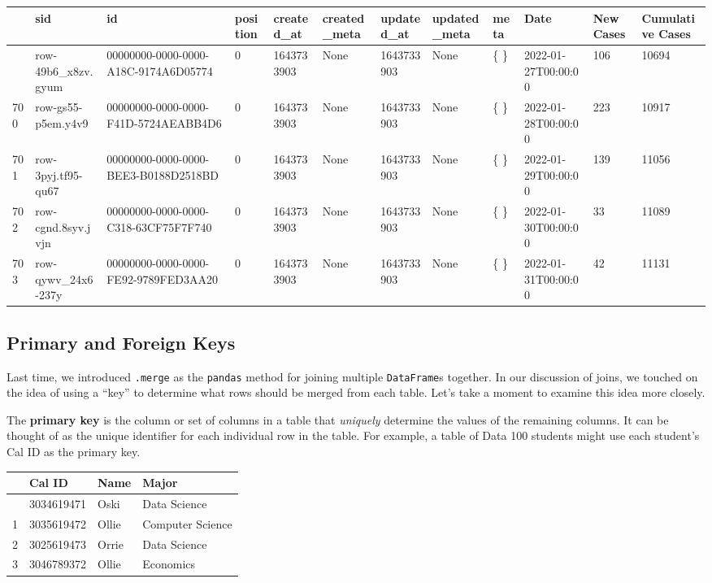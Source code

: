 \documentclass[
  letterpaper,
  DIV=11,
  numbers=noendperiod]{scrreprt}
\begin{document}
\begin{longtable}[]{@{}llllllllllll@{}}
\toprule\noalign{}
& sid & id & position & created\_at & created\_meta & updated\_at &
updated\_meta & meta & Date & New Cases & Cumulative Cases \\
\midrule\noalign{}
\endhead
\bottomrule\noalign{}
\endlastfoot
699 & row-49b6\_x8zv.gyum & 00000000-0000-0000-A18C-9174A6D05774 & 0 &
1643733903 & None & 1643733903 & None & \{ \} & 2022-01-27T00:00:00 &
106 & 10694 \\
700 & row-gs55-p5em.y4v9 & 00000000-0000-0000-F41D-5724AEABB4D6 & 0 &
1643733903 & None & 1643733903 & None & \{ \} & 2022-01-28T00:00:00 &
223 & 10917 \\
701 & row-3pyj.tf95-qu67 & 00000000-0000-0000-BEE3-B0188D2518BD & 0 &
1643733903 & None & 1643733903 & None & \{ \} & 2022-01-29T00:00:00 &
139 & 11056 \\
702 & row-cgnd.8syv.jvjn & 00000000-0000-0000-C318-63CF75F7F740 & 0 &
1643733903 & None & 1643733903 & None & \{ \} & 2022-01-30T00:00:00 & 33
& 11089 \\
703 & row-qywv\_24x6-237y & 00000000-0000-0000-FE92-9789FED3AA20 & 0 &
1643733903 & None & 1643733903 & None & \{ \} & 2022-01-31T00:00:00 & 42
& 11131 \\
\end{longtable}

\subsection{Primary and Foreign Keys}\label{primary-and-foreign-keys}

Last time, we introduced \texttt{.merge} as the \texttt{pandas} method
for joining multiple \texttt{DataFrame}s together. In our discussion of
joins, we touched on the idea of using a ``key'' to determine what rows
should be merged from each table. Let's take a moment to examine this
idea more closely.

The \textbf{primary key} is the column or set of columns in a table that
\emph{uniquely} determine the values of the remaining columns. It can be
thought of as the unique identifier for each individual row in the
table. For example, a table of Data 100 students might use each
student's Cal ID as the primary key.

\begin{longtable}[]{@{}llll@{}}
\toprule\noalign{}
& Cal ID & Name & Major \\
\midrule\noalign{}
\endhead
\bottomrule\noalign{}
\endlastfoot
0 & 3034619471 & Oski & Data Science \\
1 & 3035619472 & Ollie & Computer Science \\
2 & 3025619473 & Orrie & Data Science \\
3 & 3046789372 & Ollie & Economics \\
\end{longtable}
\end{document}

